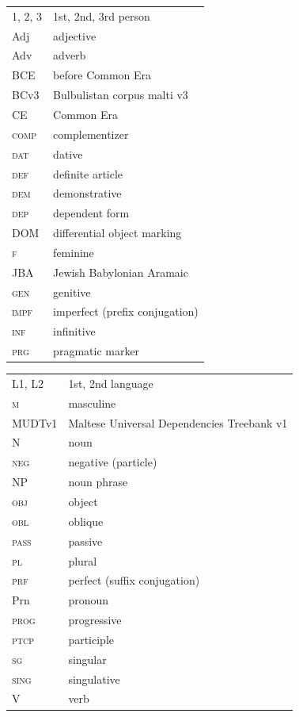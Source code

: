 \documentclass[output=paper]{langsci/langscibook}
\begin{document}
\begin{tabularx}{.5\textwidth}{@{}lQ@{}}
\textsc{1, 2, 3} & 1st, 2nd, 3rd person \\
Adj & adjective \\
Adv & adverb \\
BCE & before Common Era \\
\textsc BCv3 & Bulbulistan corpus malti v3 \\
CE & Common Era \\
\textsc{comp} & complementizer \\
\textsc{dat} & dative \\
\textsc{def} & definite article \\
\textsc{dem} & demonstrative \\
\textsc{dep} & dependent form \\
DOM & differential object marking \\
\textsc{f} & feminine \\
JBA & Jewish Babylonian Aramaic \\
\textsc{gen} & genitive \\
\textsc{impf} & imperfect (prefix conjugation) \\
\textsc{inf} & infinitive \\
\textsc{prg} & pragmatic marker \\
\end{tabularx}%
\begin{tabularx}{.5\textwidth}{@{}lQ@{}}
\textsc{L1, L2} & 1st, 2nd language \\
\textsc{m} & masculine \\
MUDTv1 & Maltese Universal Dependencies Treebank v1 \\
N & noun \\
\textsc{neg} & negative (particle) \\
NP & noun phrase\\
\textsc{obj} & object \\
\textsc{obl} & oblique \\
\textsc{pass} & passive \\
\textsc{pl} & plural \\
\textsc{prf} & perfect (suffix conjugation) \\
Prn & pronoun \\
\textsc{prog} & progressive \\
\textsc{ptcp} & participle \\
\textsc{sg} & singular \\
\textsc{sing} & singulative \\
V & verb \\
\end{tabularx}%
\end{document}
